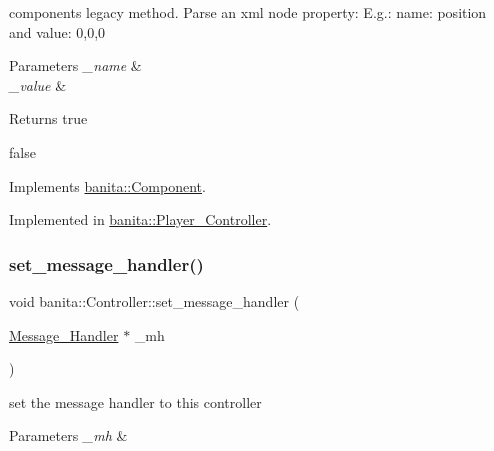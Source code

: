 component\textquotesingle{}s legacy method. Parse an xml node property\+: E.\+g.\+: name\+: position and value\+: 0,0,0 


\begin{DoxyParams}{Parameters}
{\em \+\_\+name} & \\
\hline
{\em \+\_\+value} & \\
\hline
\end{DoxyParams}
\begin{DoxyReturn}{Returns}
true 

false 
\end{DoxyReturn}


Implements \mbox{\hyperlink{classbanita_1_1_component_a619154ef2bed8e4493413bdef6117716}{banita\+::\+Component}}.



Implemented in \mbox{\hyperlink{classbanita_1_1_player___controller_ab25a1e791ce020ff226b6324cc2c5c67}{banita\+::\+Player\+\_\+\+Controller}}.

\mbox{\label{classbanita_1_1_controller_a3686102ef847f2f08a1107cfba48f00c}} 
\subsubsection{\texorpdfstring{set\_message\_handler()}{set\_message\_handler()}}
{\footnotesize\ttfamily void banita\+::\+Controller\+::set\+\_\+message\+\_\+handler (\begin{DoxyParamCaption}\item[{\mbox{\hyperlink{classbanita_1_1_message___handler}{Message\+\_\+\+Handler}} $\ast$}]{\+\_\+mh }\end{DoxyParamCaption})\hspace{0.3cm}{\ttfamily [inline]}}



set the message handler to this controller 


\begin{DoxyParams}{Parameters}
{\em \+\_\+mh} & \\
\hline
\end{DoxyParams}
\mbox{\label{classbanita_1_1_controller_a553973436941dd97e75511583a4fff26}} 
